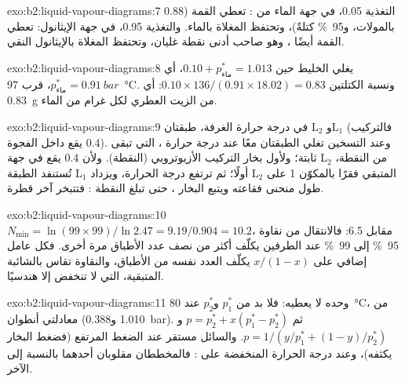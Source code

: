 \begin{solution}{exo:b2:liquid-vapour-diagrams:7}
التغذية 0.05، في جهة الماء من : تعطي القمة 
(0.88 بالمولات، و95~\% كتلةً)، وتحتفظ المغلاة بالماء. والتغذية 0.95، في جهة
الإيثانول: تعطي القمة أيضًا ، وهو صاحب أدنى نقطة غليان،
وتحتفظ المغلاة بالإيثانول النقي.
\end{solution}

\begin{solution}{exo:b2:liquid-vapour-diagrams:8}
يغلي الخليط حين $0.10 + p^*_{\text{ماء}} = 1.013$، أي
$p^*_{\text{ماء}} = \qty{0.91}{bar}$، قرب \qty{97}{\degreeCelsius}. ونسبة الكتلتين
$0.10 \times 136/(0.91 \times 18.02) = 0.83$: أي \qty{0.83}{g} من الزيت العطري لكل غرام
من الماء.
\end{solution}

\begin{solution}{exo:b2:liquid-vapour-diagrams:9}
في درجة حرارة الغرفة، طبقتان L$_2$ وL$_1$ (فالتركيب 0.4 يقع داخل
الفجوة). وعند التسخين تغلي الطبقتان معًا عند درجة حرارة ، التي تبقى ثابتة؛ ولأول بخار التركيب
الأزيوتروبي (النقطة). ولأن 0.4 يقع في جهة L$_2$ من النقطة، تُستنفد الطبقة
L$_1$ أولًا؛ ثم ترتفع درجة الحرارة، ويزداد L$_2$ المتبقي
فقرًا بالمكوّن 1 على طول منحنى فقاعته ويتبع البخار ، حتى
تبلغ النقطة : فتتبخر آخر قطرة.
\end{solution}

\begin{solution}{exo:b2:liquid-vapour-diagrams:10}
$N_{\min} = \ln(99 \times 99)/\ln 2.47 = 9.19/0.904 = 10.2$، مقابل 6.5: فالانتقال
من نقاوة 95~\% إلى 99~\% عند الطرفين يكلّف أكثر من نصف عدد الأطباق
مرة أخرى. فكل عامل إضافي على $x/(1 - x)$ يكلّف العدد نفسه من الأطباق،
والنقاوة تقاس بالشائبة المتبقية، التي لا تنخفض إلا هندسيًا.
\end{solution}

\begin{solution}{exo:b2:liquid-vapour-diagrams:11}
 وحده لا يعطيه: فلا بد من $p_1^*$ و$p_2^*$ عند
\qty{80}{\degreeCelsius}، من معادلتي أنطوان (1.010 
و\qty{0.388}{bar}). ثم $p = p_2^* + x(p_1^* - p_2^*)$ و$p = 1/(y/p_1^* + (1 -
y)/p_2^*)$. والسائل مستقر عند الضغط المرتفع (فضغط البخار
يكثفه)، وعند درجة الحرارة المنخفضة على : فالمخططان
مقلوبان أحدهما بالنسبة إلى الآخر.
\end{solution}


